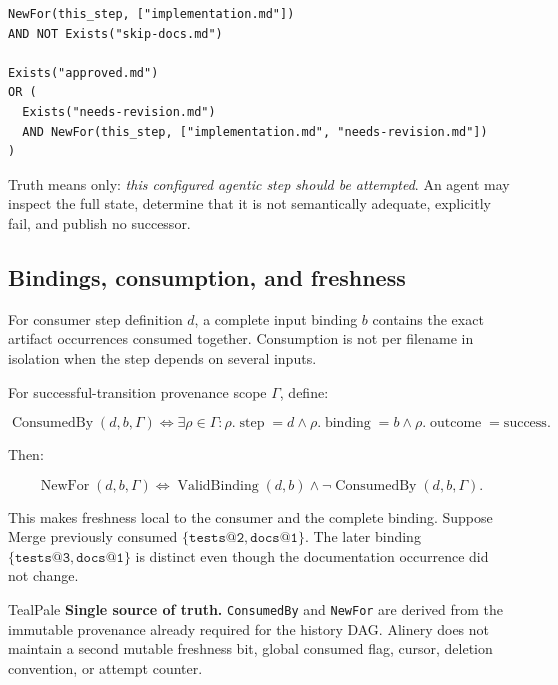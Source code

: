 \documentclass[11pt]{article}
\newcommand{\artifact}[1]{\texttt{#1}}
\begin{document}
\begin{lstlisting}[style=playbook]
NewFor(this_step, ["implementation.md"])
AND NOT Exists("skip-docs.md")

Exists("approved.md")
OR (
  Exists("needs-revision.md")
  AND NewFor(this_step, ["implementation.md", "needs-revision.md"])
)
\end{lstlisting}

Truth means only: \emph{this configured agentic step should be attempted}. An agent may inspect the full state, determine that it is not semantically adequate, explicitly fail, and publish no successor.

\subsection{Bindings, consumption, and freshness}

For consumer step definition \(d\), a complete input binding \(b\) contains the exact artifact occurrences consumed together. Consumption is not per filename in isolation when the step depends on several inputs.

For successful-transition provenance scope \(\Gamma\), define:

\begin{equation}
\operatorname{ConsumedBy}(d,b,\Gamma)
\iff
\exists \rho\in\Gamma:
  \rho.\operatorname{step}=d
  \land \rho.\operatorname{binding}=b
  \land \rho.\operatorname{outcome}=\mathrm{success}.
\end{equation}

Then:

\begin{equation}
\operatorname{NewFor}(d,b,\Gamma)
\iff
\operatorname{ValidBinding}(d,b)
\land
\neg\operatorname{ConsumedBy}(d,b,\Gamma).
\end{equation}

This makes freshness local to the consumer and the complete binding. Suppose Merge previously consumed \(\{\texttt{tests@2},\texttt{docs@1}\}\). The later binding \(\{\texttt{tests@3},\texttt{docs@1}\}\) is distinct even though the documentation occurrence did not change.

\begin{decisionbox}{TealPale}
\textbf{Single source of truth.} \artifact{ConsumedBy} and \artifact{NewFor} are derived from the immutable provenance already required for the history DAG. Alinery does not maintain a second mutable freshness bit, global consumed flag, cursor, deletion convention, or attempt counter.
\end{decisionbox}
\end{document}
